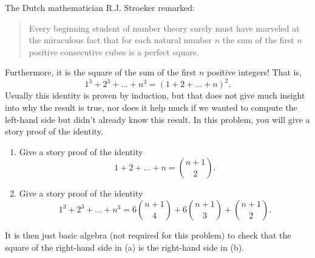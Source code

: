 \begin{exercise}{22}
    The Dutch mathematician R.J. Stroeker remarked:
    \begin{quote}
        Every beginning student of number theory surely must have marveled at the miraculous fact that for each natural number $n$ the sum of the first $n$ positive consecutive cubes is a perfect square.
    \end{quote}
    Furthermore, it is the square of the sum of the first $n$ positive integers! That is,
    $$1^3 + 2^3 + ... + n^3 = (1+2+...+n)^2.$$
    Usually this identity is proven by induction, but that does not give much insight into why the result is true, nor does it help much if we wanted to compute the left-hand side but didn't already know this result. In this problem, you will give a story proof of the identity.
    \begin{enumerate}
        \item Give a story proof of the identity
        $$1+2+...+n=\binom{n+1}{2}.$$
        \item Give a story proof of the identity
        $$1^3+2^3+...+n^3 = 6\binom{n+1}{4} + 6\binom{n+1}{3} + \binom{n+1}{2}.$$
    \end{enumerate}
    It is then just basic algebra (not required for this problem) to check that the square of the right-hand side in (a) is the right-hand side in (b).
\end{exercise}
